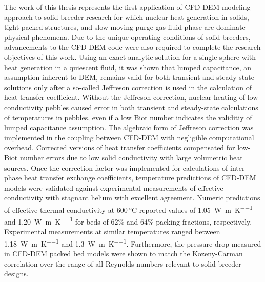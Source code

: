 The work of this thesis represents the first application of CFD-DEM modeling approach to solid breeder research for which nuclear heat generation in solids, tight-packed structures, and slow-moving purge gas fluid phase are dominate physical phenomena. Due to the unique operating conditions of solid breeders, advancements to the CFD-DEM code were also required to complete the research objectives of this work. Using an exact analytic solution for a single sphere with heat generation in a quiescent fluid, it was shown that lumped capacitance, an assumption inherent to DEM, remains valid for both transient and steady-state solutions only after a so-called Jeffreson correction is used in the calculation of heat transfer coefficient. Without the Jeffreson correction, nuclear heating of low conductivity pebbles caused error in both transient and steady-state calculations of temperatures in pebbles, even if a low Biot number indicates the validitiy of lumped capacitance assumption. The algebraic form of Jeffreson correction was implemented in the coupling between CFD-DEM with negligible computational overhead. Corrected versions of heat transfer coefficients compensated for low-Biot number errors due to low solid conductivity with large volumetric heat sources. Once the correction factor was implemented for calculations of inter-phase heat transfer exchange coefficients, temperature predictions of CFD-DEM models were validated against experimental measurements of effective conductivity with stagnant helium with excellent agreement. Numeric predictions of effective thermal conductivity at $\SI{600}{\celsius}$ reported values of \SI{1.05}{\watt\per\meter\per\kelvin} and \SI{1.20}{\watt\per\meter\per\kelvin} for beds of 62\% and 64\% packing fractions, respectively. Experimental measurements at similar temperatures ranged between \SI{1.18}{\watt\per\meter\per\kelvin} and \SI{1.3}{\watt\per\meter\per\kelvin}. Furthermore, the pressure drop measured in CFD-DEM packed bed models were shown to match the Kozeny-Carman correlation over the range of all Reynolds numbers relevant to solid breeder designs.

